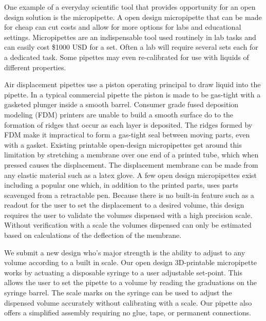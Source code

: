 \documentclass[10pt,letterpaper]{article}
\begin{document}
One example of a everyday scientific tool that provides opportunity for an open design solution is the micropipette.
A open design micropipette that can be made for cheap can cut costs and allow for more options for labs and educational settings.
Micropipettes are an indispensable tool used routinely in lab tasks and can easily cost \$1000 USD for a set.
Often a lab will require several sets each for a dedicated task.
Some pipettes may even re-calibrated for use with liquids of different properties.

Air displacement pipettes use a piston operating principal to draw liquid into the pipette\cite{ISO8655}.
In a typical commercial pipette the piston is made to be gas-tight with a gasketed plunger inside a smooth barrel.
Consumer grade fused deposition modeling (FDM) printers are unable to build a smooth surface do to the formation of ridges that occur as each layer is deposited.
The ridges formed by FDM make it impractical to form a gas-tight seal between moving parts, even with a gasket.
Existing printable open-design micropipettes get around this limitation by stretching a membrane over one end of a printed tube, which when pressed causes the displacement.
The displacement membrane can be made from any elastic material such as a latex glove.
A few open design micropipettes exist including a popular one which, in addition to the printed parts, uses parts scavenged from a retractable pen\cite{Baden2014}.
Because there is no built-in feature such as a readout for the user to set the displacement to a desired volume, this design requires the user to validate the volumes dispensed with a high precision scale.
Without verification with a scale the volumes dispensed can only be estimated based on calculations of the deflection of the membrane.

We submit a new design who's major strength is the ability to adjust to any volume according to a built in scale.
Our open design 3D-printable micropipette works by actuating a disposable syringe to a user adjustable set-point.
This allows the user to set the pipette to a volume by reading the graduations on the syringe barrel.
The scale marks on the syringe can be used to adjust the dispensed volume accurately without calibrating with a scale.
Our pipette also offers a simplified assembly requiring no glue, tape, or permanent connections.
\end{document}
